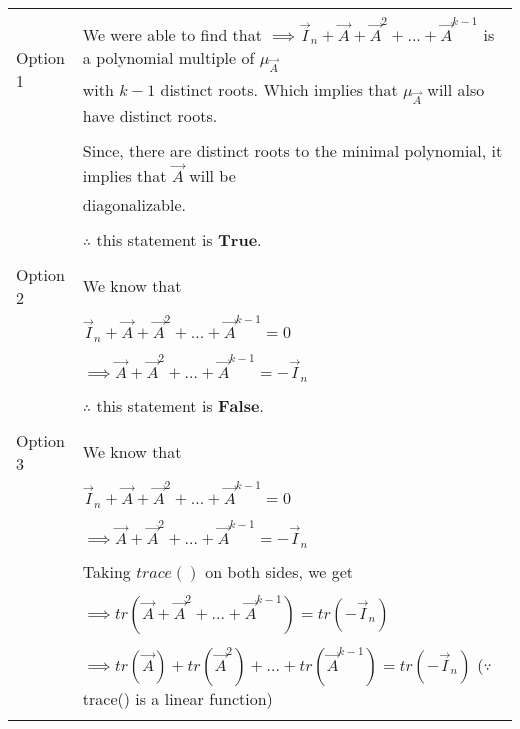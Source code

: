 \documentclass[journal,12pt]{IEEEtran}
\begin{document}
\begin{longtable}{|l|l|}
		\multirow{3}{*}{Option 1  } & \\
		& We were able to find that $\implies \vec{I}_n + \vec{A} + \vec{A}^2 + ... + \vec{A}^{k-1}$ is a polynomial multiple of $\mu_{\vec{A}}$ \\
		& with $k-1$ distinct roots. Which implies that $\mu_{\vec{A}}$ will also have distinct roots. \\
		& \\
		& Since, there are distinct roots to the minimal polynomial, it implies that $\vec{A}$ will be \\ 
		& diagonalizable. \\
		& \\
		& $\therefore$ this statement is $\mathbf{True}$. \\
		&\\
		\hline
		\multirow{3}{*}{Option 2} & \\
		& We know that \\
		& \\
		& \qquad \qquad \qquad $\vec{I}_n + \vec{A} + \vec{A}^2 + ... + \vec{A}^{k-1} = 0$ \\
		& \\
		& \qquad \qquad $\implies \vec{A} + \vec{A}^2 + ... + \vec{A}^{k-1} = -\vec{I}_n$ \\
		& \\
		& $\therefore$ this statement is $\mathbf{False}$. \\
		&\\
		\hline
		\multirow{3}{*}{Option 3} & \\
		& We know that \\
		& \\
		& \qquad \qquad \qquad $\vec{I}_n + \vec{A} + \vec{A}^2 + ... + \vec{A}^{k-1} = 0$ \\
		& \\
		& \qquad \qquad $\implies \vec{A} + \vec{A}^2 + ... + \vec{A}^{k-1} = -\vec{I}_n$ \\
		& \\
		& Taking $trace()$ on both sides, we get \\
		& \\
		& \qquad \qquad $\implies tr(\vec{A} + \vec{A}^2 + ... + \vec{A}^{k-1}) = tr(-\vec{I}_n)$ \\
		& \\
		& \qquad \qquad $\implies tr(\vec{A}) + tr(\vec{A}^2) + ... + tr(\vec{A}^{k-1}) = tr(-\vec{I}_n)$ \qquad ($\because$ trace() is a linear function)\\
		& \\

\end{longtable}
\end{document}
